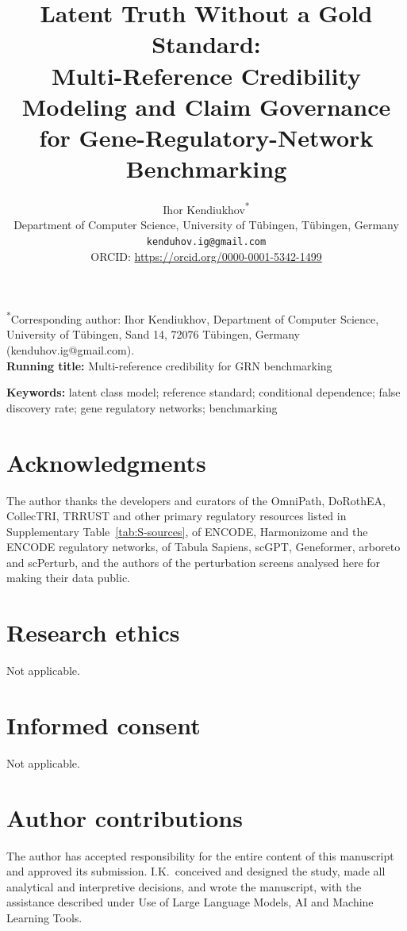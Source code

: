 \documentclass[11pt,a4paper]{article}
\title{%
  Latent Truth Without a Gold Standard:\\
  Multi-Reference Credibility Modeling and Claim Governance\\
  for Gene-Regulatory-Network Benchmarking%
}
\author{%
  Ihor Kendiukhov\textsuperscript{*}\\[4pt]
  {\normalsize Department of Computer Science, University of T\"ubingen, T\"ubingen, Germany}\\[2pt]
  {\normalsize \texttt{kenduhov.ig@gmail.com}}\\[2pt]
  {\small ORCID: \url{https://orcid.org/0000-0001-5342-1499}}
}
\date{}
\begin{document}
\linenumbers
\maketitle
\noindent\textsuperscript{*}Corresponding author: Ihor Kendiukhov, Department of Computer Science, University of T\"ubingen, Sand 14, 72076 T\"ubingen, Germany (kenduhov.ig@gmail.com).\\
\noindent\textbf{Running title:} Multi-reference credibility for GRN benchmarking

\begin{abstract}

\end{abstract}

\noindent\textbf{Keywords:} latent class model; reference standard; conditional dependence; false discovery rate; gene regulatory networks; benchmarking









\section*{Acknowledgments}
The author thanks the developers and curators of the OmniPath, DoRothEA, CollecTRI, TRRUST and other primary regulatory resources listed in Supplementary Table~\ref{tab:S-sources}, of ENCODE, Harmonizome and the ENCODE regulatory networks, of Tabula Sapiens, scGPT, Geneformer, arboreto and scPerturb, and the authors of the perturbation screens analysed here for making their data public.

\section*{Research ethics}
Not applicable.

\section*{Informed consent}
Not applicable.

\section*{Author contributions}
The author has accepted responsibility for the entire content of this manuscript and approved its submission. I.K.\ conceived and designed the study, made all analytical and interpretive decisions, and wrote the manuscript, with the assistance described under Use of Large Language Models, AI and Machine Learning Tools.
\end{document}
